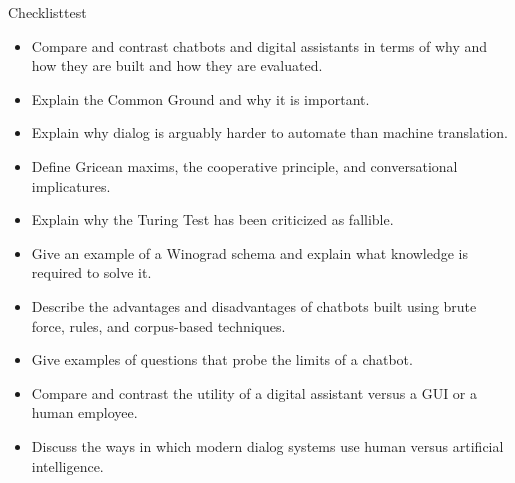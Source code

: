 \begin{tblsfilledsymbol}{Checklist}{test}
    
\begin{itemize}
\item Compare and contrast chatbots and digital assistants in terms of why and how they are built and how they are evaluated.
\item Explain the Common Ground and why it is important.
\item Explain why dialog is arguably harder to automate than machine translation.
\item Define  Gricean maxims, the cooperative principle, and conversational implicatures.
\item Explain why the Turing Test has been criticized as fallible.
\item Give an example of a Winograd schema and explain what knowledge is required to solve it.
\item Describe the advantages and disadvantages of chatbots built using brute force, rules, and corpus-based techniques.
\item Give examples of questions that probe the limits of a chatbot.
\item Compare and contrast the utility of a digital assistant versus a GUI or a human employee.
\item Discuss the ways in which modern dialog systems use human versus artificial intelligence.
\end{itemize}
\end{tblsfilledsymbol}



